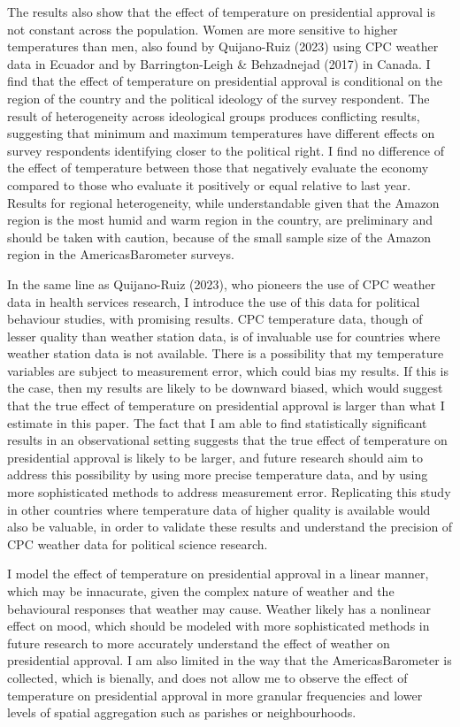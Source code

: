 \documentclass[
  12pt,
  letterpaper,
  DIV=11,
  numbers=noendperiod]{scrartcl}
\begin{document}
The results also show that the effect of temperature on presidential
approval is not constant across the population. Women are more sensitive
to higher temperatures than men, also found by Quijano-Ruiz (2023) using
CPC weather data in Ecuador and by Barrington-Leigh \& Behzadnejad
(2017) in Canada. I find that the effect of temperature on presidential
approval is conditional on the region of the country and the political
ideology of the survey respondent. The result of heterogeneity across
ideological groups produces conflicting results, suggesting that minimum
and maximum temperatures have different effects on survey respondents
identifying closer to the political right. I find no difference of the
effect of temperature between those that negatively evaluate the economy
compared to those who evaluate it positively or equal relative to last
year. Results for regional heterogeneity, while understandable given
that the Amazon region is the most humid and warm region in the country,
are preliminary and should be taken with caution, because of the small
sample size of the Amazon region in the AmericasBarometer surveys.

In the same line as Quijano-Ruiz (2023), who pioneers the use of CPC
weather data in health services research, I introduce the use of this
data for political behaviour studies, with promising results. CPC
temperature data, though of lesser quality than weather station data, is
of invaluable use for countries where weather station data is not
available. There is a possibility that my temperature variables are
subject to measurement error, which could bias my results. If this is
the case, then my results are likely to be downward biased, which would
suggest that the true effect of temperature on presidential approval is
larger than what I estimate in this paper. The fact that I am able to
find statistically significant results in an observational setting
suggests that the true effect of temperature on presidential approval is
likely to be larger, and future research should aim to address this
possibility by using more precise temperature data, and by using more
sophisticated methods to address measurement error. Replicating this
study in other countries where temperature data of higher quality is
available would also be valuable, in order to validate these results and
understand the precision of CPC weather data for political science
research.

I model the effect of temperature on presidential approval in a linear
manner, which may be innacurate, given the complex nature of weather and
the behavioural responses that weather may cause. Weather likely has a
nonlinear effect on mood, which should be modeled with more
sophisticated methods in future research to more accurately understand
the effect of weather on presidential approval. I am also limited in the
way that the AmericasBarometer is collected, which is bienally, and does
not allow me to observe the effect of temperature on presidential
approval in more granular frequencies and lower levels of spatial
aggregation such as parishes or neighbourhoods.
\end{document}
